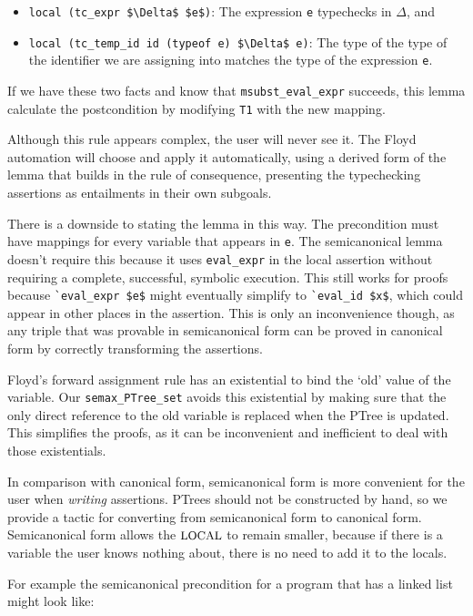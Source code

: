 \documentclass{puthesis}
\begin{document}
\begin{itemize}
\item \lstinline|local (tc_expr $\Delta$ $e$)|: The expression \lstinline|e|
  typechecks in $\Delta$, and
\item \lstinline|local (tc_temp_id id (typeof e) $\Delta$ e)|: The type of
  the type of the identifier we are assigning into matches the type of
  the expression \lstinline|e|.
\end{itemize}

If we have these two facts and know that \lstinline|msubst_eval_expr|
succeeds, this lemma calculate the postcondition by modifying
\lstinline|T1| with the new mapping.

Although this rule appears complex, the user will never see it. The
Floyd automation will choose and apply it automatically, using a
derived form of the lemma that builds in the rule of consequence,
presenting the typechecking assertions as entailments in their own
subgoals.

There is a downside to stating the lemma in this way. The precondition
must have mappings for every variable that appears in \lstinline|e|. The
semicanonical lemma doesn't require this because it uses
\lstinline|eval_expr| in the local assertion without requiring a
complete, successful, symbolic execution. This still works for proofs
because \lstinline|`eval_expr $e$| might eventually simplify to
\lstinline|`eval_id $x$|, which could appear in other places in the
assertion. This is only an inconvenience though, as any triple that
was provable in semicanonical form can be proved in canonical form by
correctly transforming the assertions.

Floyd's forward assignment rule has an existential to bind the `old'
value of the variable.  Our \lstinline|semax_PTree_set| avoids this
existential by making sure that the only direct reference to the old
variable is replaced when the PTree is updated.  This simplifies the
proofs, as it can be inconvenient and inefficient to deal with those
existentials.

In comparison with canonical form, semicanonical form is more
convenient for the user when \emph{writing} assertions. PTrees should
not be constructed by hand, so we provide a tactic for converting from
semicanonical form to canonical form. Semicanonical form allows the
$\mbox{\small LOCAL}$ to remain smaller, because if there is a variable the user
knows nothing about, there is no need to add it to the locals. 

For example the semicanonical precondition for a program that has a linked list
might look like:
\end{document}
